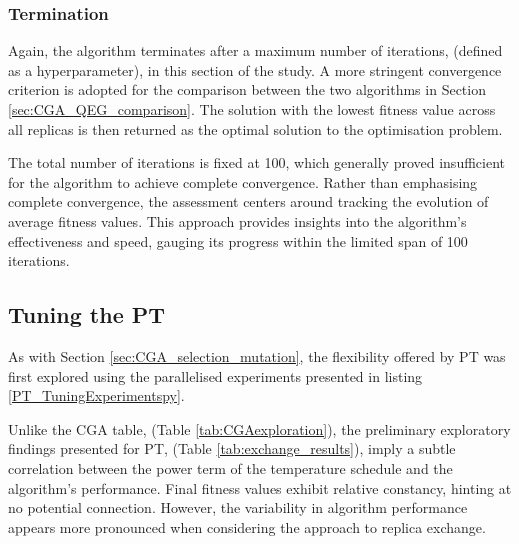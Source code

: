 \documentclass[10pt]{article}
\begin{document}
\begin{multicols}{2}
\subsubsection{Termination}

Again, the algorithm terminates after a maximum number of iterations, (defined as a hyperparameter), in this section of the study. A more stringent convergence criterion is adopted for the comparison between the two algorithms in Section \ref{sec:CGA_QEG_comparison}. The solution with the lowest fitness value across all replicas is then returned as the optimal solution to the optimisation problem.

The total number of iterations is fixed at 100, which generally proved insufficient for the algorithm to achieve complete convergence. Rather than emphasising complete convergence, the assessment centers around tracking the evolution of average fitness values. This approach provides insights into the algorithm's effectiveness and speed, gauging its progress within the limited span of 100 iterations.

\subsection{Tuning the PT}
\label{sec:PTtuning}

As with Section \ref{sec:CGA_selection_mutation}, the flexibility offered by PT was first explored using the parallelised experiments presented in listing \ref{PT_TuningExperimentspy}.

Unlike the CGA table, (Table \ref{tab:CGAexploration}), the preliminary exploratory findings presented for PT, (Table \ref{tab:exchange_results}), imply a subtle correlation between the power term of the temperature schedule and the algorithm's performance. Final fitness values exhibit relative constancy, hinting at no potential connection. However, the variability in algorithm performance appears more pronounced when considering the approach to replica exchange.


\end{multicols}
\end{document}
